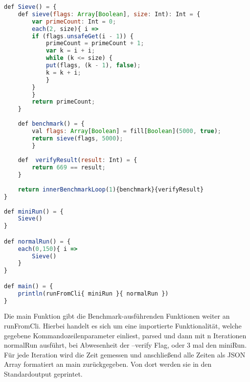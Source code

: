 \begin{lstlisting}[language=JavaScript]
def Sieve() = {
    def sieve(flags: Array[Boolean], size: Int): Int = {
        var primeCount: Int = 0;
        each(2, size){ i =>
        if (flags.unsafeGet(i - 1)) {
            primeCount = primeCount + 1;
            var k = i + i;
            while (k <= size) {
            put(flags, (k - 1), false);
            k = k + i;
            }
        }
        }
        return primeCount;
    }
    
    def benchmark() = {
        val flags: Array[Boolean] = fill[Boolean](5000, true);
        return sieve(flags, 5000);
        }
    
    def  verifyResult(result: Int) = {
        return 669 == result;
    }
    
    return innerBenchmarkLoop(1){benchmark}{verifyResult}   
}
    
def miniRun() = {
    Sieve()
}

def normalRun() = {
    each(0,150){ i =>
        Sieve()
    }
}

def main() = {
    println(runFromCli{ miniRun }{ normalRun })
}
\end{lstlisting}
Die main Funktion gibt die Benchmark-ausführenden Funktionen weiter an runFromCli. Hierbei handelt es sich um eine importierte Funktionalität, welche gegebene Kommandozeilenparameter einliest, parsed und dann mit n Iterationen normalRun ausführt, bei Abwesenheit der --verify Flag, oder 3 mal den miniRun.
Für jede Iteration wird die Zeit gemessen und anschließend alle Zeiten als JSON Array formatiert an main zurückgegeben. Von dort werden sie in den Standardoutput geprintet.

